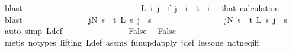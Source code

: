 \begin{isabellebody}
\ blast\isanewline
\ \ \ \ \ \ \ \ \ \ \ \ \isamarkupfalse%
\isanewline
\isanewline
\ \ \ \ \ \ \ \ \ \ \ \ \isamarkupfalse%
\ \isamarkupfalse%
\ {\isachardoublequoteopen}L\ i\ j\ {\isacharequal}{\kern0pt}\ f\ j{\isachardoublequoteclose}\ \ {\isachardoublequoteopen}i\ {\isacharless}{\kern0pt}\ t{\isachardoublequoteclose}\ \ i\ \isamarkupfalse%
\ that\ calculation\ \isamarkupfalse%
\ blast\isanewline
\ \ \ \ \ \ \ \ \ \ \ \ \isamarkupfalse%
\ \isamarkupfalse%
\ {\isachardoublequoteopen}{\isacharparenleft}{\kern0pt}{\isasymexists}j{\isacharless}{\kern0pt}N{\isacharprime}{\kern0pt}{\isachardot}{\kern0pt}\ {\isacharparenleft}{\kern0pt}{\isasymforall}s\ {\isacharless}{\kern0pt}\ t{\isachardot}{\kern0pt}\ L\ s\ j\ {\isacharequal}{\kern0pt}\ s{\isacharparenright}{\kern0pt}{\isacharparenright}{\kern0pt}{\isachardoublequoteclose}\ \isamarkupfalse%
\isanewline
\ \ \ \ \ \ \ \ \ \ \ \ \ \ \ \ {\isacartoucheopen}{\isacharparenleft}{\kern0pt}{\isasymexists}j{\isacharless}{\kern0pt}N{\isacharprime}{\kern0pt}{\isachardot}{\kern0pt}\ {\isacharparenleft}{\kern0pt}{\isasymforall}s\ {\isacharless}{\kern0pt}\ t{\isachardot}{\kern0pt}\ L{\isacharprime}{\kern0pt}\ s\ j\ {\isacharequal}{\kern0pt}\ s{\isacharparenright}{\kern0pt}{\isacharparenright}{\kern0pt}{\isacartoucheclose}\ \isamarkupfalse%
\ {\isacharparenleft}{\kern0pt}auto\ simp{\isacharcolon}{\kern0pt}\ L{\isacharprime}{\kern0pt}{\isacharunderscore}{\kern0pt}def{\isacharparenright}{\kern0pt}\isanewline
\ \ \ \ \ \ \ \ \ \ \ \ \isamarkupfalse%
\ \isamarkupfalse%
\ False\ \isamarkupfalse%
\ False\isanewline
\ \ \ \ \ \ \ \ \ \ \ \ \ \ \isamarkupfalse%
\ {\isacharparenleft}{\kern0pt}metis\ {\isacharparenleft}{\kern0pt}no{\isacharunderscore}{\kern0pt}types{\isacharcomma}{\kern0pt}\ lifting{\isacharparenright}{\kern0pt}\ L{\isacharprime}{\kern0pt}{\isacharunderscore}{\kern0pt}def\ assms{\isacharparenleft}{\kern0pt}{}{\isacharparenright}{\kern0pt}\ fun{\isacharunderscore}{\kern0pt}upd{\isacharunderscore}{\kern0pt}apply\ j{\isacharunderscore}{\kern0pt}def\ less{\isacharunderscore}{\kern0pt}one\ nat{\isacharunderscore}{\kern0pt}neq{\isacharunderscore}{\kern0pt}iff{\isacharparenright}{\kern0pt}\isanewline
\ \ \ \ \ \ \ \ \ \ \isamarkupfalse%
\isanewline
\ \ \ \ \ \ \ \ \ \ \isamarkupfalse%
\ \isamarkupfalse%

\end{isabellebody}
